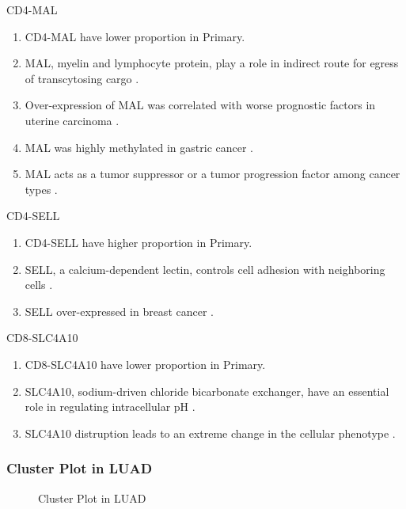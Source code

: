\documentclass{beamer}
\begin{document}
\begin{frame}[allowframebreaks]
        \begin{block}{CD4-MAL}
            \begin{enumerate}
                \item CD4-MAL have lower proportion in Primary.
                \item MAL, myelin and lymphocyte protein, play a role in indirect route for egress of transcytosing cargo \cite{MAL-1}.
                \item Over-expression of MAL was correlated with worse prognostic factors in uterine carcinoma \cite{MAL-2}.
                \item MAL was highly methylated in gastric cancer \cite{MAL-3}.
                \item MAL acts as a tumor suppressor or a tumor progression factor among cancer types \cite{MAL-4}.
            \end{enumerate}
        \end{block}

        \begin{block}{CD4-SELL}
            \begin{enumerate}
                \item CD4-SELL have higher proportion in Primary.
                \item SELL, a calcium-dependent lectin, controls cell adhesion with neighboring cells \cite{SELL-1, SELL-2}.
                \item SELL over-expressed in breast cancer \cite{SELL-3}.
            \end{enumerate}
        \end{block}

        \begin{block}{CD8-SLC4A10}
            \begin{enumerate}
                \item CD8-SLC4A10 have lower proportion in Primary.
                \item SLC4A10, sodium-driven chloride bicarbonate exchanger, have an essential role in regulating intracellular pH \cite{SLC4A10-1}.
                \item SLC4A10 distruption leads to an extreme change in the cellular phenotype \cite{SLC4A10-2}.
            \end{enumerate}
        \end{block}
    \end{frame}

    \begin{frame}
        \frametitle{Cluster Plot in LUAD}

        \begin{figure}
            \caption{Cluster Plot in LUAD}
        \end{figure}
    \end{frame}
\end{document}
